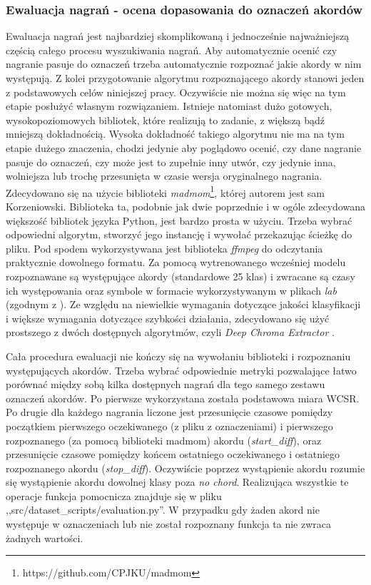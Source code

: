 \subsubsection{Ewaluacja nagrań - ocena dopasowania do oznaczeń akordów}
Ewaluacja nagrań jest najbardziej skomplikowaną i jednocześnie najważniejszą częścią całego procesu
wyszukiwania nagrań. Aby automatycznie ocenić czy nagranie pasuje do oznaczeń trzeba automatycznie
rozpoznać jakie akordy w nim występują. Z kolei przygotowanie algorytmu rozpoznającego akordy
stanowi jeden z podstawowych celów niniejszej pracy. Oczywiście nie można się więc na tym etapie
posłużyć własnym rozwiązaniem. Istnieje natomiast dużo gotowych, wysokopoziomowych bibliotek, które
realizują to zadanie, z większą bądź mniejszą dokładnością. Wysoka dokładność takiego algorytmu nie
ma na tym etapie dużego znaczenia, chodzi jedynie aby poglądowo ocenić, czy dane nagranie pasuje do
oznaczeń, czy może jest to zupełnie inny utwór, czy jedynie inna, wolniejsza lub trochę przesunięta
w czasie wersja oryginalnego nagrania. Zdecydowano się na użycie biblioteki
\emph{madmom}\footnote{https://github.com/CPJKU/madmom}, której autorem jest sam Korzeniowski.
Biblioteka ta, podobnie jak dwie poprzednie i w ogóle zdecydowana większość bibliotek języka Python,
jest bardzo prosta w użyciu. Trzeba wybrać odpowiedni algorytm, stworzyć jego instancję i wywołać
przekazując ścieżkę do pliku. Pod spodem wykorzystywana jest biblioteka \emph{ffmpeg} do odczytania
praktycznie dowolnego formatu. Za pomocą wytrenowanego wcześniej modelu rozpoznawane są występujące
akordy (standardowe 25 klas) i zwracane są czasy ich występowania oraz symbole w formacie
wykorzystywanym w plikach \emph{lab} (zgodnym z \cite{harte_towards_nodate}). Ze względu na
niewielkie wymagania dotyczące jakości klasyfikacji i większe wymagania dotyczące szybkości
działania, zdecydowano się użyć prostszego z dwóch dostępnych algorytmów, czyli \emph{Deep Chroma
Extractor} \cite{korzeniowski_feature_2016}.

Cała procedura ewaluacji nie kończy się na wywołaniu biblioteki i rozpoznaniu występujących akordów.
Trzeba wybrać odpowiednie metryki pozwalające łatwo porównać między sobą kilka dostępnych nagrań dla
tego samego zestawu oznaczeń akordów. Po pierwsze wykorzystana została podstawowa miara WCSR. Po drugie
dla każdego nagrania liczone jest przesunięcie czasowe pomiędzy początkiem pierwszego oczekiwanego
(z pliku z oznaczeniami) i pierwszego rozpoznanego (za pomocą biblioteki madmom) akordu
(\emph{start\_diff}), oraz przesunięcie czasowe pomiędzy końcem ostatniego oczekiwanego i ostatniego
rozpoznanego akordu (\emph{stop\_diff}). Oczywiście poprzez wystąpienie akordu rozumie się
wystąpienie akordu dowolnej klasy poza \emph{no chord}. Realizująca wszystkie te operacje funkcja
pomocnicza znajduje się w pliku ,,src/dataset\_scripts/evaluation.py''. W przypadku gdy żaden akord
nie występuje w oznaczeniach lub nie został rozpoznany funkcja ta nie zwraca żadnych wartości.

